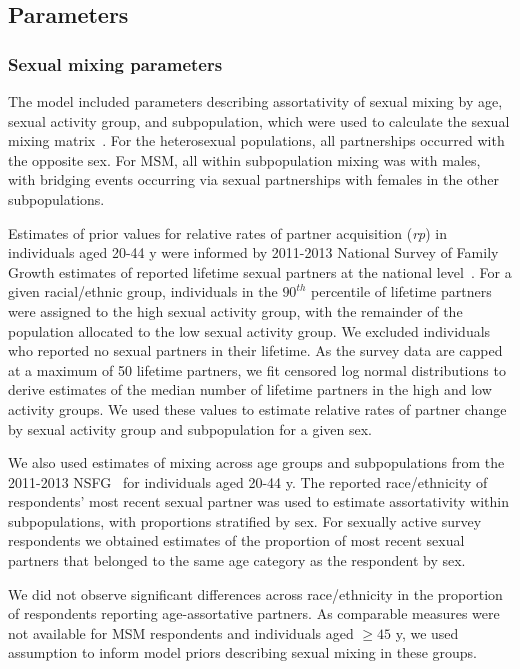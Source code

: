 \documentclass[a4paper]{article}
\begin{document}
\subsection{Parameters}
\subsubsection{Sexual mixing parameters}
\label{subsec:param}
The model included parameters describing assortativity of sexual mixing by age, sexual activity group, and subpopulation, which were used to calculate the sexual mixing matrix~\autocite{Garnett1994}. For the heterosexual populations, all partnerships occurred with the opposite sex. For MSM, all within subpopulation mixing was with males, with bridging events occurring via sexual partnerships with females in the other subpopulations. 

Estimates of prior values for relative rates of partner acquisition (\textit{rp}) in individuals aged 20-44 y were informed by 2011-2013 National Survey of Family Growth estimates of reported lifetime sexual partners at the national level~\autocite{U.S.DepartmentofHealthandHumanServices}. For a given racial/ethnic group, individuals in the $90^{th}$ percentile of lifetime partners were assigned to the high sexual activity group, with the remainder of the population allocated to the low sexual activity group. We excluded individuals who reported no sexual partners in their lifetime. As the survey data are capped at a maximum of 50 lifetime partners, we fit censored log normal distributions to derive estimates of the median number of lifetime partners in the high and low activity groups. We used these values to estimate relative rates of partner change by sexual activity group and subpopulation for a given sex. 

We also used estimates of mixing across age groups and subpopulations from the 2011-2013 NSFG~\autocite{U.S.DepartmentofHealthandHumanServices} for individuals aged 20-44 y. The reported race/ethnicity of respondents’ most recent sexual partner was used to estimate assortativity within subpopulations, with proportions stratified by sex. For sexually active survey respondents we obtained estimates of the proportion of most recent sexual partners that belonged to the same age category as the respondent by sex. 

We did not observe significant differences across race/ethnicity in the proportion of respondents reporting age-assortative partners. As comparable measures were not available for MSM respondents and individuals aged $\ge 45$ y, we used assumption to inform model priors describing sexual mixing in these groups. 
\end{document}
